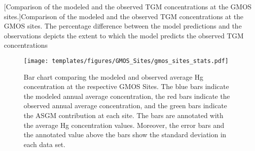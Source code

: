 \begin{table}[H]
[Comparison of the modeled \hgc and the observed TGM concentrations at the GMOS sites.]{Comparison of the modeled \hgc and the observed TGM concentrations at the GMOS sites. The percentage difference between the model predictions and the observations depicts the extent to which the model predicts the observed TGM concentrations }
\label{tab:model_percentage_overestimation_of_mean}

\center
{}
\end{table}
\FloatBarrier
\begin{figure}[H]
\texttt{[image: templates/figures/GMOS\_Sites/gmos\_sites\_stats.pdf]}
\centering
\caption[Bar chart comparing the modeled and observed average Hg concentration at the respective GMOS Sites.]{Bar chart comparing the modeled and observed average Hg concentration at the respective GMOS Sites. The blue bars indicate the modeled annual average concentration, the red bars indicate the observed annual average concentration, and the green bars indicate the ASGM contribution at each site. The bars are annotated with the average Hg concentration values. Moreover, the error bars and the annotated value above the bars show the standard deviation in each data set. }
\label{fig:gmos_sites_stats}
\end{figure}
\FloatBarrier


